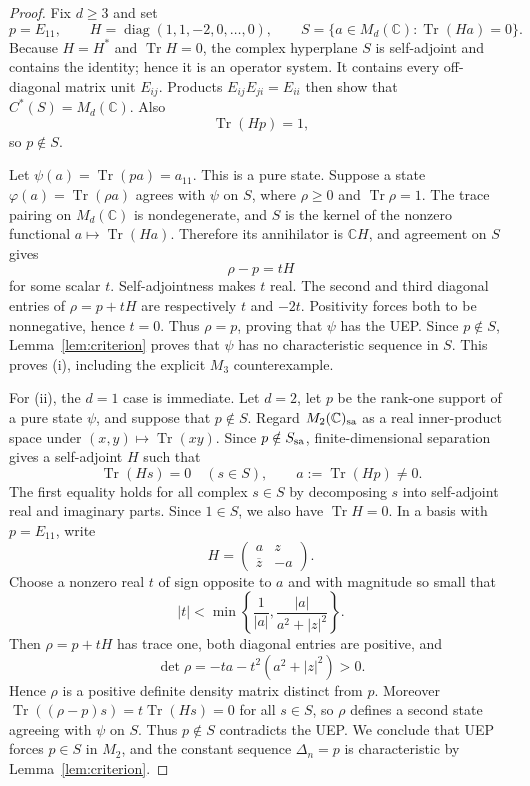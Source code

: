 \documentclass[11pt]{article}
\theoremstyle{remark}
\newcommand{\Md}{M_d(\mathbb C)}
\newcommand{\Tr}{\operatorname{Tr}}
\begin{document}
\begin{proof}
Fix $d\geq3$ and set
\[
 p=E_{11},\qquad H=\operatorname{diag}(1,1,-2,0,\ldots,0),
 \qquad S=\{a\in\Md:\Tr(Ha)=0\}.
\]
Because $H=H^*$ and $\Tr H=0$, the complex hyperplane $S$ is self-adjoint
and contains the identity; hence it is an operator system.  It contains every
off-diagonal matrix unit $E_{ij}$.  Products $E_{ij}E_{ji}=E_{ii}$ then show
that $C^*(S)=\Md$.  Also
\[
 \Tr(Hp)=1,
\]
so $p\notin S$.

Let $\psi(a)=\Tr(pa)=a_{11}$.  This is a pure state.  Suppose a state
$\varphi(a)=\Tr(\rho a)$ agrees with $\psi$ on $S$, where
$\rho\geq0$ and $\Tr\rho=1$.  The trace pairing on $\Md$ is nondegenerate,
and $S$ is the kernel of the nonzero functional $a\mapsto\Tr(Ha)$.
Therefore its annihilator is $\mathbb C H$, and agreement on $S$ gives
\[
 \rho-p=tH
\]
for some scalar $t$.  Self-adjointness makes $t$ real.  The second and third
diagonal entries of $\rho=p+tH$ are respectively $t$ and $-2t$.  Positivity
forces both to be nonnegative, hence $t=0$.  Thus $\rho=p$, proving that
$\psi$ has the UEP.  Since $p\notin S$, Lemma~\ref{lem:criterion} proves that
$\psi$ has no characteristic sequence in $S$.  This proves (i), including the
explicit $M_3$ counterexample.

For (ii), the $d=1$ case is immediate.  Let $d=2$, let $p$ be the rank-one
support of a pure state $\psi$, and suppose that $p\notin S$.  Regard
$M_2(\mathbb C)_{\rm sa}$ as a real inner-product space under
$(x,y)\mapsto\Tr(xy)$.  Since $p\notin S_{\rm sa}$, finite-dimensional
separation gives a self-adjoint $H$ such that
\[
 \Tr(Hs)=0\quad(s\in S),\qquad a:=\Tr(Hp)\neq0.
\]
The first equality holds for all complex $s\in S$ by decomposing $s$ into
self-adjoint real and imaginary parts.  Since $1\in S$, we also have
$\Tr H=0$.  In a basis with $p=E_{11}$, write
\[
 H=\begin{pmatrix}a&z\\ \overline z&-a\end{pmatrix}.
\]
Choose a nonzero real $t$ of sign opposite to $a$ and with magnitude so small
that
\[
 |t|<\min\left\{\frac1{|a|},
 \frac{|a|}{a^2+|z|^2}\right\}.
\]
Then $\rho=p+tH$ has trace one, both diagonal entries are positive, and
\[
 \det\rho=-ta-t^2(a^2+|z|^2)>0.
\]
Hence $\rho$ is a positive definite density matrix distinct from $p$.
Moreover $\Tr((\rho-p)s)=t\Tr(Hs)=0$ for all $s\in S$, so $\rho$ defines a
second state agreeing with $\psi$ on $S$.  Thus $p\notin S$ contradicts the
UEP.  We conclude that UEP forces $p\in S$ in $M_2$, and the constant sequence
$\Delta_n=p$ is characteristic by Lemma~\ref{lem:criterion}.
\end{proof}
\end{document}
